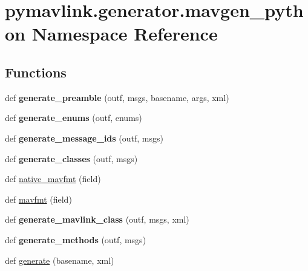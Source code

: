 \hypertarget{namespacepymavlink_1_1generator_1_1mavgen__python}{}\section{pymavlink.\+generator.\+mavgen\+\_\+python Namespace Reference}
\label{namespacepymavlink_1_1generator_1_1mavgen__python}
\subsection*{Functions}
\begin{DoxyCompactItemize}
\item 
\mbox{\label{namespacepymavlink_1_1generator_1_1mavgen__python_a780f486d09315a450a465f7a80ab0041}} 
def {\bfseries generate\+\_\+preamble} (outf, msgs, basename, args, xml)
\item 
\mbox{\label{namespacepymavlink_1_1generator_1_1mavgen__python_a253e804c65431414df3a94b98ec365be}} 
def {\bfseries generate\+\_\+enums} (outf, enums)
\item 
\mbox{\label{namespacepymavlink_1_1generator_1_1mavgen__python_a9dc4c238a02ecd403ee24d44eaebb1ce}} 
def {\bfseries generate\+\_\+message\+\_\+ids} (outf, msgs)
\item 
\mbox{\label{namespacepymavlink_1_1generator_1_1mavgen__python_ac6dff0a7f2badc0a44428acc00c9801f}} 
def {\bfseries generate\+\_\+classes} (outf, msgs)
\item 
def \hyperlink{namespacepymavlink_1_1generator_1_1mavgen__python_aa80503aac0716bddd09ad1395f7dd2d5}{native\+\_\+mavfmt} (field)
\item 
def \hyperlink{namespacepymavlink_1_1generator_1_1mavgen__python_aacfccd1b0104347f78648e168eac482d}{mavfmt} (field)
\item 
\mbox{\label{namespacepymavlink_1_1generator_1_1mavgen__python_a7c6799bd201b339f9eb6f86d486c4be5}} 
def {\bfseries generate\+\_\+mavlink\+\_\+class} (outf, msgs, xml)
\item 
\mbox{\label{namespacepymavlink_1_1generator_1_1mavgen__python_ab461b369bfa4a880e2211f4d574450e5}} 
def {\bfseries generate\+\_\+methods} (outf, msgs)
\item 
def \hyperlink{namespacepymavlink_1_1generator_1_1mavgen__python_aca7b16b5ead8d9f4c5a03ed6996b4776}{generate} (basename, xml)
\end{DoxyCompactItemize}
